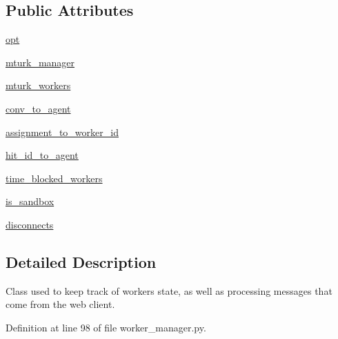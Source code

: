 \subsection*{Public Attributes}
\begin{DoxyCompactItemize}
\item 
\hyperlink{classparlai_1_1mturk_1_1core_1_1dev_1_1worker__manager_1_1WorkerManager_adb7992844dfa581014469721c7b6ebd8}{opt}
\item 
\hyperlink{classparlai_1_1mturk_1_1core_1_1dev_1_1worker__manager_1_1WorkerManager_ac998c8103c199cec59f152128f6b876c}{mturk\+\_\+manager}
\item 
\hyperlink{classparlai_1_1mturk_1_1core_1_1dev_1_1worker__manager_1_1WorkerManager_abb50897c2ac34971c1593cab077df63a}{mturk\+\_\+workers}
\item 
\hyperlink{classparlai_1_1mturk_1_1core_1_1dev_1_1worker__manager_1_1WorkerManager_a5ad208e55f54f2d2de934a17665b508d}{conv\+\_\+to\+\_\+agent}
\item 
\hyperlink{classparlai_1_1mturk_1_1core_1_1dev_1_1worker__manager_1_1WorkerManager_ad6da745885a93cca7e40eb3f21a42c36}{assignment\+\_\+to\+\_\+worker\+\_\+id}
\item 
\hyperlink{classparlai_1_1mturk_1_1core_1_1dev_1_1worker__manager_1_1WorkerManager_a90b094c83ec38bd8d95755cf99f2e771}{hit\+\_\+id\+\_\+to\+\_\+agent}
\item 
\hyperlink{classparlai_1_1mturk_1_1core_1_1dev_1_1worker__manager_1_1WorkerManager_a91e52a07f116d045069678e1b634ebeb}{time\+\_\+blocked\+\_\+workers}
\item 
\hyperlink{classparlai_1_1mturk_1_1core_1_1dev_1_1worker__manager_1_1WorkerManager_ae0e88a4e852d8e9577f9139aeaf9076b}{is\+\_\+sandbox}
\item 
\hyperlink{classparlai_1_1mturk_1_1core_1_1dev_1_1worker__manager_1_1WorkerManager_a7f6d658a79ddc418870fa31d23507070}{disconnects}
\end{DoxyCompactItemize}


\subsection{Detailed Description}
\begin{DoxyVerb}Class used to keep track of workers state, as well as processing messages that come
from the web client.
\end{DoxyVerb}
 

Definition at line 98 of file worker\+\_\+manager.\+py.



